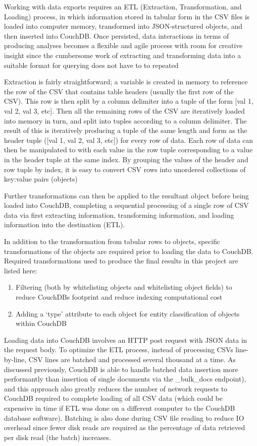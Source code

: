 Working with data exports requires an ETL (Extraction, Transformation, and Loading) process, in which information stored in tabular form in the CSV files is loaded into computer memory, transformed into JSON-structured objects, and then inserted into CouchDB. Once persisted, data interactions in terms of producing analyses becomes a flexible and agile process with room for creative insight since the cumbersome work of extracting and transforming data into a suitable format for querying does not have to to repeated

Extraction is fairly straightforward; a variable is created in memory to reference the row of the CSV that contains table headers (usually the first row of the CSV). This row is then split by a column delimiter into a tuple of the form [val 1, val 2, val 3, etc]. Then all the remaining rows of the CSV are iteratively loaded into memory in turn, and split into tuples according to a column delimiter. The result of this is iteratively producing a tuple of the same length and form as the header tuple ([val 1, val 2, val 3, etc]) for every row of data. Each row of data can then be manipulated to with each value in the row tuple corresponding to a value in the header tuple at the same index. By grouping the values of the header and row tuple by index, it is easy to convert CSV rows into unordered collections of key:value pairs (objects)

Further transformations can then be applied to the resultant object before being loaded into CouchDB, completing a sequential processing of a single row of CSV data via first extracting information, transforming information, and loading information into the destination (ETL).

In addition to the transformation from tabular rows to objects, specific transformations of the objects are required prior to loading the data to CouchDB. Required transformations used to produce the final results in this project are listed here:

\begin{enumerate}
    \item Filtering (both by whitelisting objects and whitelisting object fields) to reduce CouchDBs footprint and reduce indexing computational cost
    \item Adding a `type' attribute to each object for entity classification of objects within CouchDB
\end{enumerate}

Loading data into CouchDB involves an HTTP post request with JSON data in the request body. To optimize the ETL process, instead of processing CSVs line-by-line, CSV lines are batched and processed several thousand at a time. As discussed previously, CouchDB is able to handle batched data insertion more performantly than insertion of single documents via the \_bulk\_docs endpoint), and this approach also greatly reduces the number of network requests to CouchDB required to complete loading of all CSV data (which could be expensive in time if ETL was done on a different computer to the CouchDB database software). Batching is also done during CSV file reading to reduce IO overhead since fewer disk reads are required as the percentage of data retrieved per disk read (the batch) increases.


